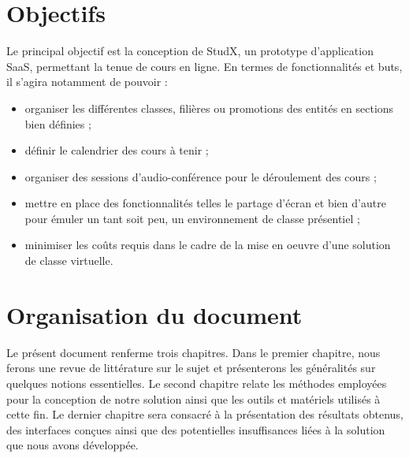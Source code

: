 \section*{Objectifs}
Le principal objectif est la conception de StudX, un prototype d’application SaaS, permettant la tenue de cours en ligne.
En termes de fonctionnalités et buts, il s’agira notamment de pouvoir :
\begin{itemize}
  \item organiser les différentes classes, filières ou promotions des entités en sections bien définies ;
  \item définir le calendrier des cours à tenir ;
  \item organiser des sessions d’audio-conférence pour le déroulement des cours ;
  \item mettre en place des fonctionnalités telles le partage d'écran et bien d’autre pour émuler un tant soit peu, 
    un environnement de classe présentiel ;
  \item minimiser les coûts requis dans le cadre de la mise en oeuvre d’une solution de classe virtuelle.
\end{itemize}

\thispagestyle{plain} %

\section*{Organisation du document}
Le présent document renferme trois chapitres. 
Dans le premier chapitre, nous ferons une revue de littérature sur le sujet 
et présenterons les généralités sur quelques notions essentielles. 
Le second chapitre relate les méthodes employées pour la conception de notre solution ainsi 
que les outils et matériels utilisés à cette fin. 
Le dernier chapitre sera consacré à la présentation des résultats obtenus, 
des interfaces conçues ainsi que des potentielles insuffisances liées à la solution que nous avons développée.
